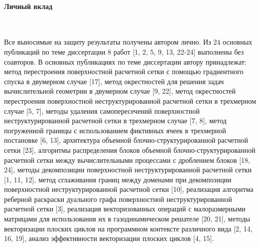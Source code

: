 \paragraph{Личный вклад} \

Все выносимые на защиту результаты получены автором лично.
Из 24 основных публикаций по теме диссертации 8 работ [1, 2, 5, 9, 13, 22-24] выполнены без соавторов.
В основных публикациях по теме диссертации автору принадлежат: метод перестроения поверхностной расчетной сетки с помощью градиентного спуска в двумерном случае [17], метод окрестностей для решения задач вычислительной геометрии в двумерном случае [9, 22], метод окрестностей перестроения поверхностной неструктурированной расчетной сетки в трехмерном случае [5, 7], методы удаления самопересечений поверхностной неструктурированной расчетной сетки в трехмерном случае [7, 8], метод погруженной границы с использованием фиктивных ячеек в трехмерной постановке [6, 13], архитектура объемной блочно-структурированной расчетной сетки [23], алгоритмы распределения блоков объемной блочно-структурированной расчетной сетки между вычислительными процессами с дроблением блоков [18, 24], методы декомпозиции поверхностной неструктурированной расчетной сетки [1, 11, 12], метод сглаживания границ между доменами при декомпозиции поверхностной неструктурированной расчетной сетки [10], реализация алгоритма реберной раскраски дуального графа поверхностной неструктурированной расчетной сетки [3], реализация векторизованных операций с малоразмерными матрицами для использования их в газодинамическом решателе [20, 21], методы векторизации плоских циклов на программном контексте различного вида [2, 14, 16, 19], анализ эффективности векторизации плоских циклов [4, 15].